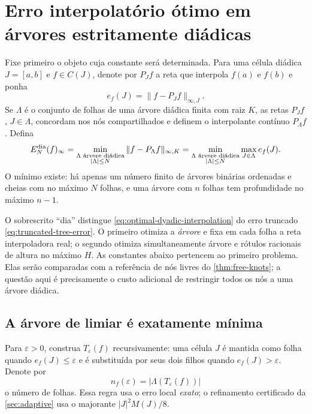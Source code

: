 \section{Erro interpolatório ótimo em árvores estritamente diádicas}
\label{sec:dyadic-asymptotic}

Fixe primeiro o objeto cuja constante será determinada. Para uma célula
diádica $J=[a,b]$ e $f\in C(J)$, denote por $P_Jf$ a reta que interpola
$f(a)$ e $f(b)$ e ponha
\begin{equation}
 e_f(J)=\|f-P_Jf\|_{\infty,J}.
 \label{eq:local-interpolation-error}
\end{equation}
Se $\Lambda$ é o conjunto de folhas de uma árvore diádica finita com raiz
$K$, as retas $P_Jf$, $J\in\Lambda$, concordam nos nós compartilhados e
definem o interpolante contínuo $P_\Lambda f$. Defina
\begin{equation}
 E_N^{\rm dia}(f)_\infty
 =\min_{\substack{\Lambda\text{ árvore diádica}\\ |\Lambda|\le N}}
   \|f-P_\Lambda f\|_{\infty,K}
 =\min_{\substack{\Lambda\text{ árvore diádica}\\ |\Lambda|\le N}}
   \max_{J\in\Lambda}e_f(J).
 \label{eq:optimal-dyadic-interpolation}
\end{equation}
O mínimo existe: há apenas um número finito de árvores binárias ordenadas e
cheias com no máximo $N$ folhas, e uma árvore com $n$ folhas tem profundidade
no máximo $n-1$.

O sobrescrito ``dia'' distingue \eqref{eq:optimal-dyadic-interpolation} do
erro truncado \eqref{eq:truncated-tree-error}. O primeiro otimiza a
\emph{árvore} e fixa em cada folha a reta interpoladora real; o segundo
otimiza simultaneamente árvore e rótulos racionais de altura no máximo $H$.
As constantes abaixo pertencem ao primeiro problema.
Elas serão comparadas com a referência de nós livres do
\cref{thm:free-knots}; a questão aqui é precisamente o custo adicional de
restringir todos os nós a uma árvore diádica.

\subsection{A árvore de limiar é exatamente mínima}

Para $\varepsilon>0$, construa $T_\varepsilon(f)$ recursivamente: uma célula
$J$ é mantida como folha quando $e_f(J)\le\varepsilon$ e é substituída por
seus dois filhos quando $e_f(J)>\varepsilon$. Denote por
\begin{equation}
 n_f(\varepsilon)=|\Lambda(T_\varepsilon(f))|
 \label{eq:threshold-count}
\end{equation}
o número de folhas. Essa regra usa o erro local \emph{exato}; o refinamento
certificado da \cref{sec:adaptive} usa o majorante $|J|^2M(J)/8$.

